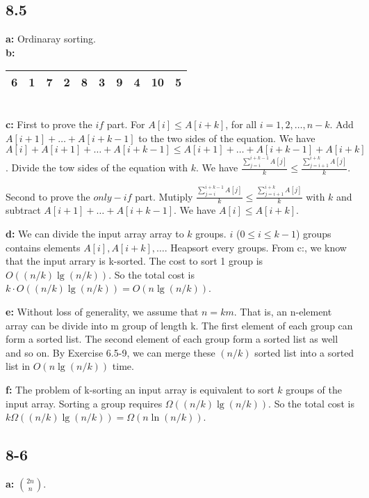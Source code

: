 \documentclass{book}
\begin{document}
\begin{CJK}{UTF8}{gkai}
\subsection*{8.5}
\textbf{a:} Ordinaray sorting. \\
\textbf{b:} \\
\begin{tabular}{|c|c|c|c|c|c|c|c|c|c|}
\hline
6 & 1 & 7 & 2 & 8 & 3 & 9 & 4 & 10 & 5 \\ \hline
\end{tabular} \\
\textbf{c:} First to prove the $if$ part. For $A[i] \le A[i+k]$, for all 
$i=1,2,\dots, n-k$. Add $A[i+1] + \dots + A[i+k-1]$ to the two sides of the 
equation. We have $A[i] + A[i+1] + \dots + A[i+k-1] \le A[i+1] + \dots + 
A[i+k-1] + A[i+k]$. Divide the tow sides of the equation with $k$. We have 
$\frac{\sum_{j=i}^{i+k-1}A[j]}{k} \le \frac{\sum_{j=i+1}^{i+k}A[j]}{k}$.

Second to prove the $only-if$ part. Mutiply $\frac{\sum_{j=i}^{i+k-1}A[j]}{k} 
\le \frac{\sum_{j=i+1}^{i+k}A[j]}{k}$ with $k$ and subtract 
$A[i+1]+\dots+A[i+k-1]$. We have $A[i] \le A[i+k]$.

\textbf{d:} We can divide the input array array to $k$ groups. $i$ ($0 \le i \le 
k-1$) groups contains elements $A[i], A[i+k], \dots$. Heapsort every groups.  
From c:, we know that the input arrary is k-sorted. The cost to sort 1 group is 
$O((n/k)\lg (n/k))$. So the total cost is $k \cdot O((n/k)\lg(n/k)) = 
O(n\lg(n/k))$.

\textbf{e:} Without loss of generality, we assume that $n = km$. That is, an 
n-element array can be divide into m group of length k. The first element of 
each group can form a sorted list. The second element of each group form a 
sorted list as well and so on. By Exercise 6.5-9, we can merge these $(n/k)$ 
sorted list into a sorted list in $O(n\lg(n/k))$ time.

\textbf{f:} The problem of k-sorting an input array is equivalent to sort $k$ 
groups of the input array. Sorting a group requires $\Omega((n/k)\lg(n/k))$. So 
the total cost is $k \Omega((n/k)\lg(n/k)) = \Omega(n\ln(n/k))$.

\subsection*{8-6}
\textbf{a:} $\binom{2n}{n}$.


\end{CJK}
\end{document}
